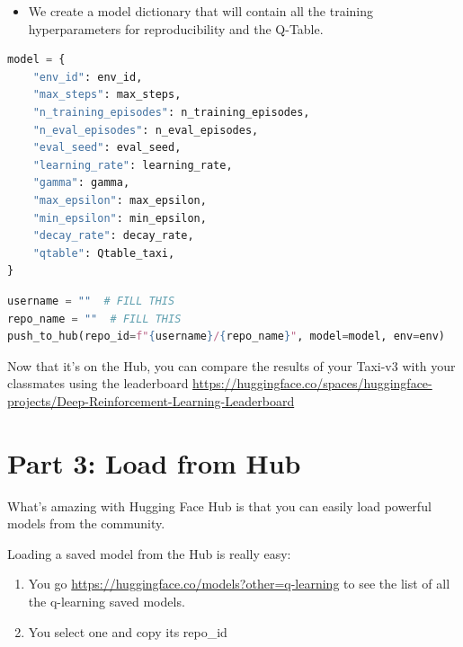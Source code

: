 \documentclass[11pt,a4paper]{article}
\begin{document}
\begin{itemize}
\tightlist
\item
  We create a model dictionary that will contain all the training hyperparameters for reproducibility and the Q-Table.
\end{itemize}

\begin{lstlisting}[language=Python]
model = {
    "env_id": env_id,
    "max_steps": max_steps,
    "n_training_episodes": n_training_episodes,
    "n_eval_episodes": n_eval_episodes,
    "eval_seed": eval_seed,
    "learning_rate": learning_rate,
    "gamma": gamma,
    "max_epsilon": max_epsilon,
    "min_epsilon": min_epsilon,
    "decay_rate": decay_rate,
    "qtable": Qtable_taxi,
}
\end{lstlisting}

\begin{lstlisting}[language=Python]
username = ""  # FILL THIS
repo_name = ""  # FILL THIS
push_to_hub(repo_id=f"{username}/{repo_name}", model=model, env=env)
\end{lstlisting}

Now that it's on the Hub, you can compare the results of your Taxi-v3 with your classmates using the leaderboard \url{https://huggingface.co/spaces/huggingface-projects/Deep-Reinforcement-Learning-Leaderboard}


\section{Part 3: Load from Hub}\label{part-3-load-from-hub}

What's amazing with Hugging Face Hub is that you can easily load powerful models from the community.

Loading a saved model from the Hub is really easy:

\begin{enumerate}
\def\labelenumi{\arabic{enumi}.}
\tightlist
\item
  You go \url{https://huggingface.co/models?other=q-learning} to see the list of all the q-learning saved models.
\item
  You select one and copy its repo\_id
\end{enumerate}

\end{document}
